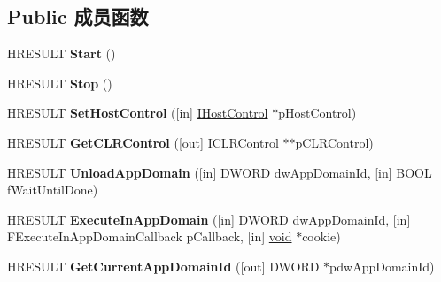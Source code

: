 \subsection*{Public 成员函数}
\begin{DoxyCompactItemize}
\item 
\mbox{\label{interface_i_c_l_r_runtime_host_af77f0b838dcef1e16354e1a967b287c7}} 
H\+R\+E\+S\+U\+LT {\bfseries Start} ()
\item 
\mbox{\label{interface_i_c_l_r_runtime_host_a45a272f2f6b8a8a34a5c57c64e0413d6}} 
H\+R\+E\+S\+U\+LT {\bfseries Stop} ()
\item 
\mbox{\label{interface_i_c_l_r_runtime_host_a5bf66203a08136a7f37404a7016a7f5f}} 
H\+R\+E\+S\+U\+LT {\bfseries Set\+Host\+Control} (\mbox{[}in\mbox{]} \hyperlink{interface_i_host_control}{I\+Host\+Control} $\ast$p\+Host\+Control)
\item 
\mbox{\label{interface_i_c_l_r_runtime_host_a76c5f37c9e57ed451b957c33fbd23c2c}} 
H\+R\+E\+S\+U\+LT {\bfseries Get\+C\+L\+R\+Control} (\mbox{[}out\mbox{]} \hyperlink{interface_i_c_l_r_control}{I\+C\+L\+R\+Control} $\ast$$\ast$p\+C\+L\+R\+Control)
\item 
\mbox{\label{interface_i_c_l_r_runtime_host_a42d40cab498f1bc0ce6b27f4b0b3e047}} 
H\+R\+E\+S\+U\+LT {\bfseries Unload\+App\+Domain} (\mbox{[}in\mbox{]} D\+W\+O\+RD dw\+App\+Domain\+Id, \mbox{[}in\mbox{]} B\+O\+OL f\+Wait\+Until\+Done)
\item 
\mbox{\label{interface_i_c_l_r_runtime_host_a31b1d3b2f67bbc80ae5b799b63ce4afe}} 
H\+R\+E\+S\+U\+LT {\bfseries Execute\+In\+App\+Domain} (\mbox{[}in\mbox{]} D\+W\+O\+RD dw\+App\+Domain\+Id, \mbox{[}in\mbox{]} F\+Execute\+In\+App\+Domain\+Callback p\+Callback, \mbox{[}in\mbox{]} \hyperlink{interfacevoid}{void} $\ast$cookie)
\item 
\mbox{\label{interface_i_c_l_r_runtime_host_acfae374f2f7c8249176f6f32827bcbfb}} 
H\+R\+E\+S\+U\+LT {\bfseries Get\+Current\+App\+Domain\+Id} (\mbox{[}out\mbox{]} D\+W\+O\+RD $\ast$pdw\+App\+Domain\+Id)
$$
\end{DoxyCompactItemize}
